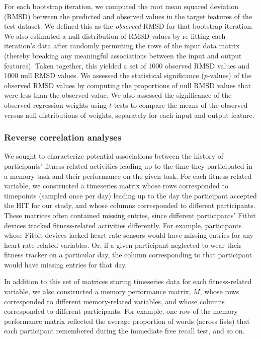 \documentclass[10pt]{article}
\begin{document}
For each bootstrap iteration, we computed the root mean squared
deviation (RMSD) between the predicted and observed values in the
target features of the test dataset.  We defined this as the
\textit{observed} RMSD for that bootstrap iteration.  We also
estimated a null distribution of RMSD values by re-fitting each
iteration's data after randomly permuting the rows of the input data
matrix 
(thereby breaking any
meaningful associations between the input and output features).  Taken
together, this yielded a set of 1000 observed RMSD values and 1000
null RMSD values.  We assessed the statistical significance
($p$-values) of the observed RMSD values by computing the proportions
of null RMSD values that were less than the observed value.  We also
assessed the significance of the observed regression weights using
$t$-tests to compare the means of the observed versus null
distributions of weights, separately for each input and output feature.

\subsubsection*{Reverse correlation analyses}
We sought to characterize potential associations between the history
of participants' fitness-related activities leading up to the time
they participated in a memory task and their performance on the given
task.  For each fitness-related variable, we constructed a timeseries
matrix whose rows corresponded to timepoints (sampled once per day)
leading up to the day the participant accepted the HIT for our study,
and whose columns corresponded to different participants.  These
matrices often contained missing entries, since different
participants' Fitbit devices tracked fitness-related activities
differently.  For example, participants whose Fitbit devices lacked
heart rate sensors would have missing entries for any heart
rate-related variables.  Or, if a given participant neglected to wear
their fitness tracker on a particular day, the column corresponding to
that participant would have missing entries for that day.

In addition to this set of matrices storing timeseries data for each
fitness-related variable, we also constructed a memory performance
matrix, $M$, whose rows corresponded to different memory-related
variables, and whose columns corresponded to different participants.
For example, one row of the memory performance matrix reflected the
average proportion of words (across lists) that each participant
remembered during the immediate free recall test, and so on.
\end{document}
